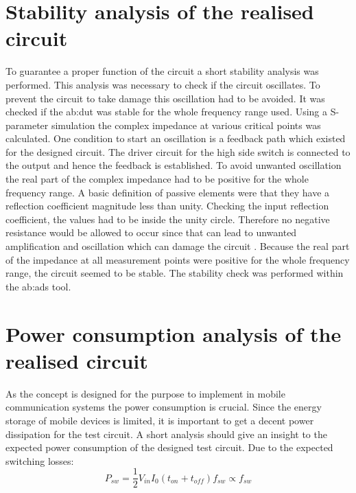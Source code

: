 \section{Stability analysis of the realised circuit}
To guarantee a proper function of the circuit a short stability analysis was performed.
This analysis was necessary to check if the circuit oscillates.
To prevent the circuit to take damage this oscillation had to be avoided.
It was checked if the \gls{ab:dut} was stable for the whole frequency range used.
Using a S-parameter simulation the complex impedance at various critical points was calculated.
One condition to start an oscillation is a feedback path which existed for the designed circuit.
The driver circuit for the high side switch is connected to the output and hence the feedback is established.
To avoid unwanted oscillation the real part of the complex impedance had to be positive for the whole frequency range.
A basic definition of passive elements were that they have a reflection coefficient magnitude less than unity.
Checking the input reflection coefficient, the values had to be inside the unity circle.
Therefore no negative resistance would be allowed to occur since that can lead to unwanted amplification and oscillation which can damage the circuit \cite{GilmoreR.2003}.
Because the real part of the impedance at all measurement points were positive for the whole frequency range, the circuit seemed to be stable.
The stability check was performed within the \gls{ab:ads} tool. 

\section{Power consumption analysis of the realised circuit}
As the concept is designed for the purpose to implement in mobile communication systems the power consumption is crucial.
Since the energy storage of mobile devices is limited, it is important to get a decent power dissipation for the test circuit.
A short analysis should give an insight to the expected power consumption of the designed test circuit.
Due to the expected switching losses:
\begin{equation}
 P_{sw} = \frac{1}{2} V_{in}I_0(t_{on}+t_{off})f_{sw} \propto f_{sw}
 \label{eq:swtichloss}
\end{equation}

